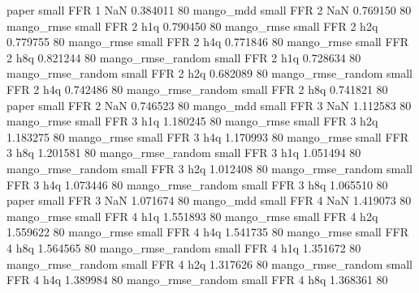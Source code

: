             paper      small      FFR                 1                  NaN 0.384011 80
        mango_mdd      small      FFR                 2                  NaN 0.769150 80
       mango_rmse      small      FFR                 2                  h1q 0.790450 80
       mango_rmse      small      FFR                 2                  h2q 0.779755 80
       mango_rmse      small      FFR                 2                  h4q 0.771846 80
       mango_rmse      small      FFR                 2                  h8q 0.821244 80
mango_rmse_random      small      FFR                 2                  h1q 0.728634 80
mango_rmse_random      small      FFR                 2                  h2q 0.682089 80
mango_rmse_random      small      FFR                 2                  h4q 0.742486 80
mango_rmse_random      small      FFR                 2                  h8q 0.741821 80
            paper      small      FFR                 2                  NaN 0.746523 80
        mango_mdd      small      FFR                 3                  NaN 1.112583 80
       mango_rmse      small      FFR                 3                  h1q 1.180245 80
       mango_rmse      small      FFR                 3                  h2q 1.183275 80
       mango_rmse      small      FFR                 3                  h4q 1.170993 80
       mango_rmse      small      FFR                 3                  h8q 1.201581 80
mango_rmse_random      small      FFR                 3                  h1q 1.051494 80
mango_rmse_random      small      FFR                 3                  h2q 1.012408 80
mango_rmse_random      small      FFR                 3                  h4q 1.073446 80
mango_rmse_random      small      FFR                 3                  h8q 1.065510 80
            paper      small      FFR                 3                  NaN 1.071674 80
        mango_mdd      small      FFR                 4                  NaN 1.419073 80
       mango_rmse      small      FFR                 4                  h1q 1.551893 80
       mango_rmse      small      FFR                 4                  h2q 1.559622 80
       mango_rmse      small      FFR                 4                  h4q 1.541735 80
       mango_rmse      small      FFR                 4                  h8q 1.564565 80
mango_rmse_random      small      FFR                 4                  h1q 1.351672 80
mango_rmse_random      small      FFR                 4                  h2q 1.317626 80
mango_rmse_random      small      FFR                 4                  h4q 1.389984 80
mango_rmse_random      small      FFR                 4                  h8q 1.368361 80
